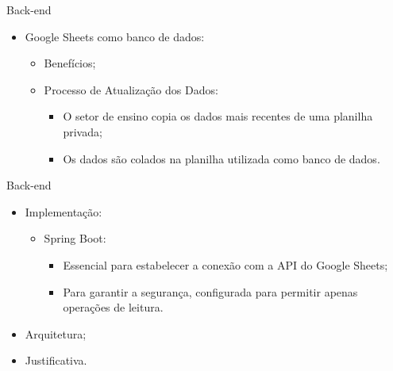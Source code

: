 \begin{frame}{Back-end}
    \begin{itemize}
        \item Google Sheets como banco de dados: \vspace{0.5cm}
              \begin{itemize}
                  \item Benefícios; \vspace{0.5cm}
                  \item Processo de Atualização dos Dados: \vspace{0.5cm}
                        \begin{itemize}
                            \item O setor de ensino copia os dados mais recentes de uma planilha privada; \vspace{0.5cm}
                            \item Os dados são colados na planilha utilizada como banco de dados. \vspace{0.5cm}
                        \end{itemize}
              \end{itemize}
    \end{itemize}
\end{frame}

\begin{frame}{Back-end}
    \begin{itemize}
        \item Implementação: \vspace{0.5cm}
              \begin{itemize}
                  \item Spring Boot: \vspace{0.5cm}
                        \begin{itemize}
                            \item Essencial para estabelecer a conexão com a API do Google Sheets; \vspace{0.5cm}
                            \item Para garantir a segurança, configurada para permitir apenas operações de leitura. \vspace{0.5cm}
                        \end{itemize}
              \end{itemize}
        \item Arquitetura; \vspace{0.5cm}
        \item Justificativa. \vspace{0.5cm}
    \end{itemize}
\end{frame}

